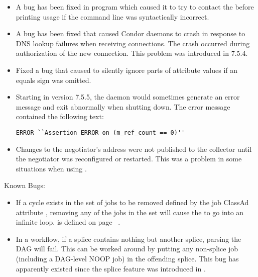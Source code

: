 \begin{itemize}
\item A bug has been fixed in  program which
  caused it to try to contact the  before printing
  usage if the command line was syntactically incorrect.

\item A bug has been fixed that caused Condor daemons to crash in
  response to DNS lookup failures when receiving connections.  The
  crash occurred during authorization of the new connection.  This
  problem was introduced in 7.5.4.

\item Fixed a bug that caused  to silently ignore parts
of attribute values if an equals sign was omitted.

\item Starting in version 7.5.5, the  daemon would
  sometimes generate an error message and exit abnormally when
  shutting down.  The error message contained the following text:

\begin{verbatim}
ERROR ``Assertion ERROR on (m_ref_count == 0)''
\end{verbatim}

\item Changes to the negotiator's address were not published to the
  collector until the negotiator was reconfigured or restarted.  This was
  a problem in some situations when using .

\end{itemize}

\noindent Known Bugs:

\begin{itemize}

\item If a cycle exists in the set of jobs to be removed defined by 
the job ClassAd attribute ,
removing any of the jobs in the set will cause the
 to go into an infinite loop.
 is defined on
page ~\pageref{attribute-OtherJobRemoveRequirements}.

\item In a  workflow, if a splice contains nothing but
another splice, parsing the DAG will fail.  This can be worked around
by putting any non-splice job (including a DAG-level NOOP job) in the
offending splice.  This bug has apparently existed since the splice
feature was introduced in .


\end{itemize}


